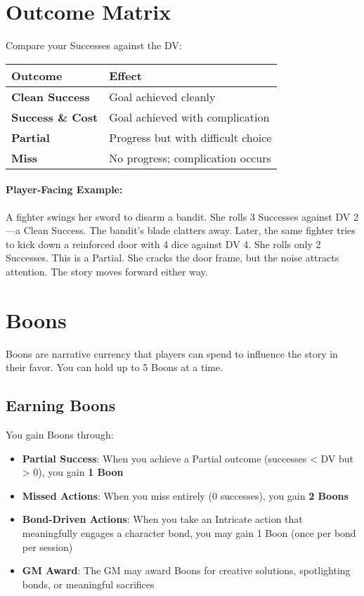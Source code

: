 \section{Outcome Matrix} 

Compare your Successes against the DV:

\begin{center}
\small
\begin{tabular}{ll}
\toprule
\textbf{Outcome} & \textbf{Effect} \\
\midrule
\textbf{Clean Success}\index{Success!Clean} & Goal achieved cleanly \\
\textbf{Success \& Cost}\index{Success!with Cost} & Goal achieved with complication \\
\textbf{Partial}\index{Partial} & Progress but with difficult choice \\
\textbf{Miss}\index{Miss} & No progress; complication occurs \\
\bottomrule
\end{tabular}
\end{center}

\paragraph{Player-Facing Example:}  
A fighter swings her sword to disarm a bandit. She rolls 3 Successes against DV 2—a Clean Success. The bandit's blade clatters away.  
Later, the same fighter tries to kick down a reinforced door with 4 dice against DV 4. She rolls only 2 Successes. This is a Partial. She cracks the door frame, but the noise attracts attention. The story moves forward either way.

\section{Boons} 

Boons are narrative currency that players can spend to influence the story in their favor. You can hold up to 5 Boons at a time.

\subsection*{Earning Boons}
You gain Boons through:
\begin{itemize}
\item \textbf{Partial Success}: When you achieve a Partial outcome (successes < DV but > 0), you gain \textbf{1 Boon}
\item \textbf{Missed Actions}: When you miss entirely (0 successes), you gain \textbf{2 Boons}
\item \textbf{Bond-Driven Actions}: When you take an Intricate action that meaningfully engages a character bond, you may gain 1 Boon (once per bond per session)
\item \textbf{GM Award}: The GM may award Boons for creative solutions, spotlighting bonds, or meaningful sacrifices
\end{itemize}

